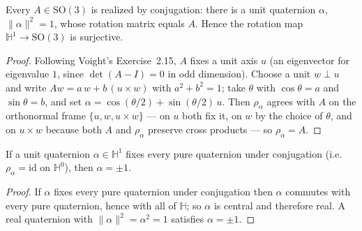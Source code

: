 \begin{lemma}
    \label{lem:rotation-surjective}
    \leanok
    Every $A \in \mathrm{SO}(3)$ is realized by conjugation: there is a unit
    quaternion $\alpha$, $\lVert\alpha\rVert^2 = 1$, whose rotation matrix equals
    $A$. Hence the rotation map $\mathbb{H}^1 \to \mathrm{SO}(3)$ is surjective.
\end{lemma}
\begin{proof}
    Following Voight's Exercise~2.15, $A$ fixes a unit axis $u$ (an eigenvector for
    eigenvalue $1$, since $\det(A - I) = 0$ in odd dimension). Choose a unit
    $w \perp u$ and write $Aw = a\,w + b\,(u \times w)$ with $a^2 + b^2 = 1$; take
    $\theta$ with $\cos\theta = a$ and $\sin\theta = b$, and set
    $\alpha = \cos(\theta/2) + \sin(\theta/2)\,u$. Then $\rho_\alpha$ agrees with
    $A$ on the orthonormal frame $\{u, w, u\times w\}$ --- on $u$ both fix it, on
    $w$ by the choice of $\theta$, and on $u\times w$ because both $A$ and
    $\rho_\alpha$ preserve cross products --- so $\rho_\alpha = A$.
\end{proof}

\begin{lemma}
    \label{lem:rotation-kernel}
    \leanok
    If a unit quaternion $\alpha \in \mathbb{H}^1$ fixes every pure quaternion
    under conjugation (i.e. $\rho_\alpha = \mathrm{id}$ on $\mathbb{H}^0$), then
    $\alpha = \pm 1$.
\end{lemma}
\begin{proof}
    If $\alpha$ fixes every pure quaternion under conjugation then $\alpha$
    commutes with every pure quaternion, hence with all of $\mathbb{H}$; so
    $\alpha$ is central and therefore real. A real quaternion with
    $\lVert\alpha\rVert^2 = \alpha^2 = 1$ satisfies $\alpha = \pm 1$.
\end{proof}

